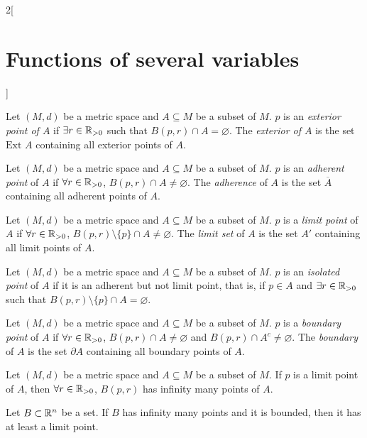 \documentclass[../../../main.tex]{subfiles}
\begin{document}
\begin{multicols}{2}[\section{Functions of several variables}]
\begin{definition}
  \end{definition}
  \begin{definition}
    Let $(M,d)$ be a metric space and $A\subseteq M$ be a subset of $M$. $p$ is an \textit{exterior point of $A$} if $\exists r\in\mathbb{R}_{>0}$ such that $B(p,r)\cap A=\varnothing$. The \textit{exterior of $A$} is the set $\text{Ext } A$ containing all exterior points of $A$.
  \end{definition}
  \begin{definition}
    Let $(M,d)$ be a metric space and $A\subseteq M$ be a subset of $M$. $p$ is an \textit{adherent point} of $A$ if $\forall r\in\mathbb{R}_{>0}$, $B(p,r)\cap A\ne\varnothing$. The \textit{adherence} of $A$ is the set $\overline{A}$ containing all adherent points of $A$.
  \end{definition}
  \begin{definition}
    Let $(M,d)$ be a metric space and $A\subseteq M$ be a subset of $M$. $p$ is a \textit{limit point} of $A$ if $\forall r\in\mathbb{R}_{>0}$, $B(p,r)\setminus\{p\}\cap A\ne\varnothing$. The \textit{limit set} of $A$ is the set $A'$ containing all limit points of $A$.
  \end{definition}
  \begin{definition}
    Let $(M,d)$ be a metric space and $A\subseteq M$ be a subset of $M$. $p$ is an \textit{isolated point} of $A$ if it is an adherent but not limit point, that is, if $p\in A$ and $\exists r\in\mathbb{R}_{>0}$ such that $B(p,r)\setminus\{p\}\cap A=\varnothing$.
  \end{definition}
  \begin{definition}
    Let $(M,d)$ be a metric space and $A\subseteq M$ be a subset of $M$. $p$ is a \textit{boundary point} of $A$ if $\forall r\in\mathbb{R}_{>0}$, $B(p,r)\cap A\ne\varnothing$ and $B(p,r)\cap A^c\ne\varnothing$. The \textit{boundary} of $A$ is the set $\partial A$ containing all boundary points of $A$.
  \end{definition}
  \begin{prop}
    Let $(M,d)$ be a metric space and $A\subseteq M$ be a subset of $M$. If $p$ is a limit point of $A$, then $\forall r\in\mathbb{R}_{>0}$, $B(p,r)$ has infinity many points of $A$.
  \end{prop}
  \begin{theorem}
    Let $B\subset\mathbb{R}^n$ be a set. If $B$ has infinity many points and it is bounded, then it has at least a limit point.
  \end{theorem}
  \begin{definition}

\end{definition}
\end{multicols}
\end{document}
